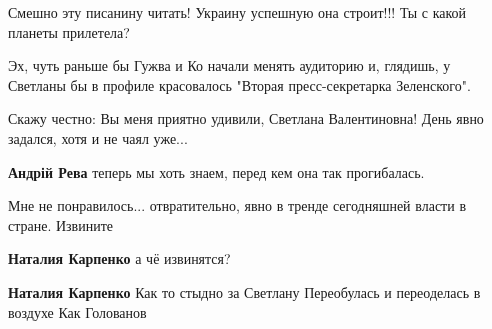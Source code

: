 \begin{itemize}
Смешно эту писанину читать! Украину успешную она строит!!! Ты с какой планеты прилетела?

 
Эх, чуть раньше бы Гужва и Ко начали менять аудиторию и, глядишь, у Светланы бы в профиле красовалось "Вторая пресс-секретарка Зеленского".

 
Скажу честно: Вы меня приятно удивили, Светлана Валентиновна! День явно задался, хотя и не чаял уже...

\begin{itemize}
 
\textbf{Андрій Рева} теперь мы хоть знаем, перед кем она так прогибалась.
\end{itemize}

 
Мне не понравилось... отвратительно, явно в тренде сегодняшней власти в стране.
Извините

\begin{itemize}
 
\textbf{Наталия Карпенко} а чё извинятся?

 
\textbf{Наталия Карпенко}
\obeycr
	Как то стыдно за Светлану
	Переобулась и переоделась в воздухе
	Как Голованов
\restorecr
\end{itemize}


\end{itemize}
